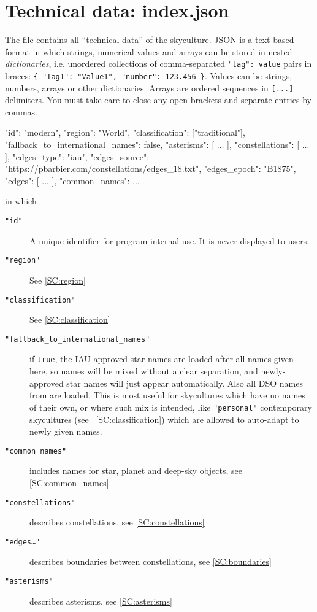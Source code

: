 \section{Technical data: index.json}
\label{sec:skycultures:index.json}
\label{SC:index.json}

\newcommand{\jtag}[1]{\texttt{"#1"}}


The file  contains all ``technical data'' of the skyculture. 
JSON is a text-based format in which strings, numerical values and arrays can be stored in nested \emph{dictionaries}, 
i.e. unordered collections of comma-separated \texttt{"tag": value} pairs in braces: \texttt{\{ "Tag1": "Value1", "number": 123.456 \}}. 
Values can be strings, numbers, arrays or other dictionaries. Arrays are ordered sequences in \texttt{[...]} delimiters.  
You must take care to close any open brackets and separate entries by commas. 


\begin{jsonfile}[\scriptsize]
{
  "id": "modern",
  "region": "World",
  "classification": ["traditional"],
  "fallback_to_international_names": false,
  "asterisms": [ ... ],
  "constellations": [ ... ],
  "edges_type": "iau",
  "edges_source": "https://pbarbier.com/constellations/edges_18.txt",
  "edges_epoch": "B1875",
  "edges": [ ... ],
  "common_names": { ... }
}
\end{jsonfile}

in which
\begin{description}
\item[\jtag{id}] A unique identifier for program-internal use. It is never displayed to users. 
\item[\jtag{region}] See \ref{SC:region}
\item[\jtag{classification}] See \ref{SC:classification}
\item[\jtag{fallback\_to\_international\_names}] if \texttt{true}, the IAU-approved star names are loaded after all names given here, 
so names will be mixed without a clear separation, and newly-approved star names will just appear automatically. 
Also all DSO names from  are loaded.
This is most useful for skycultures which have no names of their own, or where such mix is intended, 
like \jtag{personal} contemporary skycultures (see ~\ref{SC:classification}) which are allowed to auto-adapt to newly given names. 
\item[\jtag{common\_names}] includes names for star, planet and deep-sky objects, see \ref{SC:common_names}
\item[\jtag{constellations}] describes constellations, see \ref{SC:constellations}
\item[\jtag{edges\ldots}] describes boundaries between constellations, see \ref{SC:boundaries}
\item[\jtag{asterisms}]  describes asterisms, see \ref{SC:asterisms}
\end{description}

